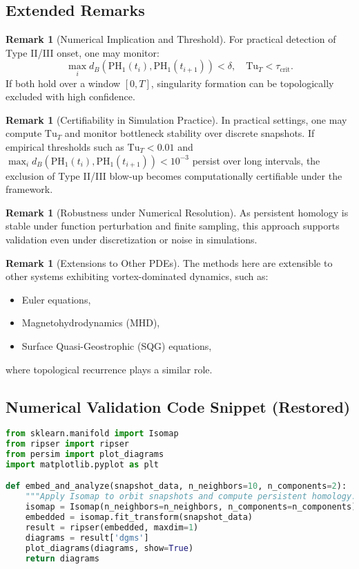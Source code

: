 \documentclass[11pt]{article}
\theoremstyle{definition}
\newtheorem{remark}[theorem]{Remark}
\begin{document}
\subsection*{Extended Remarks}

\begin{remark}[Numerical Implication and Threshold]
For practical detection of Type II/III onset, one may monitor:
\[
\max_{i} d_B(\mathrm{PH}_1(t_i), \mathrm{PH}_1(t_{i+1})) < \delta, \quad \mathrm{Tu}_T < \tau_{\text{crit}}.
\]
If both hold over a window $[0,T]$, singularity formation can be topologically excluded with high confidence.
\end{remark}

\begin{remark}[Certifiability in Simulation Practice]
In practical settings, one may compute $\mathrm{Tu}_T$ and monitor bottleneck stability over discrete snapshots. If empirical thresholds such as $\mathrm{Tu}_T < 0.01$ and $\max_i d_B(\mathrm{PH}_1(t_i), \mathrm{PH}_1(t_{i+1})) < 10^{-3}$ persist over long intervals, the exclusion of Type II/III blow-up becomes computationally certifiable under the framework.
\end{remark}

\begin{remark}[Robustness under Numerical Resolution]
As persistent homology is stable under function perturbation and finite sampling, this approach supports validation even under discretization or noise in simulations.
\end{remark}

\begin{remark}[Extensions to Other PDEs]
The methods here are extensible to other systems exhibiting vortex-dominated dynamics, such as:
\begin{itemize}
  \item Euler equations,
  \item Magnetohydrodynamics (MHD),
  \item Surface Quasi-Geostrophic (SQG) equations,
\end{itemize}
where topological recurrence plays a similar role.
\end{remark}

\subsection*{Numerical Validation Code Snippet (Restored)}

\begin{lstlisting}[language=Python, caption=Isomap + Persistent Homology Validation for Navier--Stokes Orbit Geometry]
from sklearn.manifold import Isomap
from ripser import ripser
from persim import plot_diagrams
import matplotlib.pyplot as plt

def embed_and_analyze(snapshot_data, n_neighbors=10, n_components=2):
    """Apply Isomap to orbit snapshots and compute persistent homology."""
    isomap = Isomap(n_neighbors=n_neighbors, n_components=n_components)
    embedded = isomap.fit_transform(snapshot_data)
    result = ripser(embedded, maxdim=1)
    diagrams = result['dgms']
    plot_diagrams(diagrams, show=True)
    return diagrams
\end{lstlisting}
\end{document}
